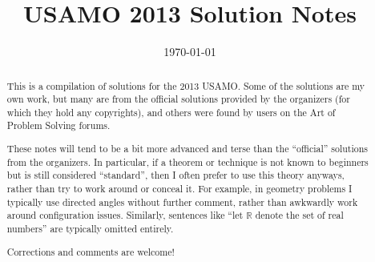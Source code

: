 \documentclass[11pt]{scrartcl}
\title{USAMO 2013 Solution Notes}
\date{\today}
\begin{document}
\maketitle

\begin{abstract}
This is a compilation of solutions
for the 2013 USAMO.
Some of the solutions are my own work,
but many are from the official solutions provided by the organizers
(for which they hold any copyrights),
and others were found by users on the Art of Problem Solving forums.

These notes will tend to be a bit more advanced and terse than the ``official''
solutions from the organizers.
In particular, if a theorem or technique is not known to beginners
but is still considered ``standard'', then I often prefer to
use this theory anyways, rather than try to work around or conceal it.
For example, in geometry problems I typically use directed angles
without further comment, rather than awkwardly work around configuration issues.
Similarly, sentences like ``let $\mathbb{R}$ denote the set of real numbers''
are typically omitted entirely.

Corrections and comments are welcome!
\end{abstract}

\tableofcontents
\newpage

\addtocounter{section}{-1}
\end{document}
